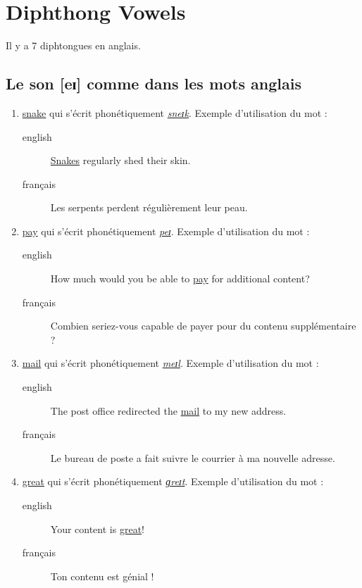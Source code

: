 \section{Diphthong Vowels}
\label{sec:orgbc226d9}
Il y a 7 diphtongues en anglais.
\subsection{Le son [eɪ] comme dans les mots anglais}
\label{sec:orgccc0406}
\begin{enumerate}
\item \href{http://www.wordreference.com/enfr/snake}{snake} qui s'écrit phonétiquement \href{https://en.oxforddictionaries.com/definition/snake}{\emph{sneɪk}}. Exemple d'utilisation du mot :
\begin{description}
\item[{english}] \textenglish{\href{https://youtu.be/MOltIVdyAHQ}{Snakes} regularly shed their skin.}
\item[{français}] Les serpents perdent régulièrement leur peau.
\end{description}
\item \href{http://www.wordreference.com/enfr/pay}{pay} qui s'écrit phonétiquement \href{https://en.oxforddictionaries.com/definition/pay}{\emph{peɪ}}. Exemple d'utilisation du mot : 
\begin{description}
\item[{english}] \textenglish{How much would you be able to \href{https://youtu.be/mBuLm5XeF44}{pay} for additional
content?}
\item[{français}] Combien seriez-vous capable de payer pour du contenu
supplémentaire ?
\end{description}
\item \href{http://www.wordreference.com/enfr/mail}{mail} qui s'écrit phonétiquement \href{https://en.oxforddictionaries.com/definition/mail}{\emph{meɪl}}. Exemple d'utilisation du mot :
\begin{description}
\item[{english}] \textenglish{The post office redirected the \href{https://youtu.be/KX1CSSZa1v0}{mail} to my new address.}
\item[{français}] Le bureau de poste a fait suivre le courrier à ma
nouvelle adresse.
\end{description}
\item \href{http://www.wordreference.com/enfr/great}{great} qui s'écrit phonétiquement \href{https://en.oxforddictionaries.com/definition/great}{\emph{ɡreɪt}}. Exemple d'utilisation du mot :
\begin{description}
\item[{english}] \textenglish{Your content is \href{https://youtu.be/e0qM84DWXzA}{great}!}
\item[{français}] Ton contenu est génial !
\end{description}
\end{enumerate}
